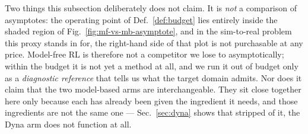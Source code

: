 Two things this subsection deliberately does not claim. It is \emph{not} a
comparison of asymptotes: the operating point of Def.~\ref{def:budget} lies
entirely inside the shaded region of Fig.~\ref{fig:mf-vs-mb-asymptote}, and in
the sim-to-real problem this proxy stands in for, the right-hand side of that
plot is not purchasable at any price. Model-free RL is therefore not a
competitor we lose to asymptotically; within the budget it is not yet a method
at all, and we run it out of budget only as a \emph{diagnostic reference} that
tells us what the target domain admits. Nor does it claim that the two
model-based arms are interchangeable. They sit close together here only because
each has already been given the ingredient it needs, and those ingredients are
not the same one --- Sec.~\ref{sec:dyna} shows that stripped of it, the
Dyna arm does not function at all.


